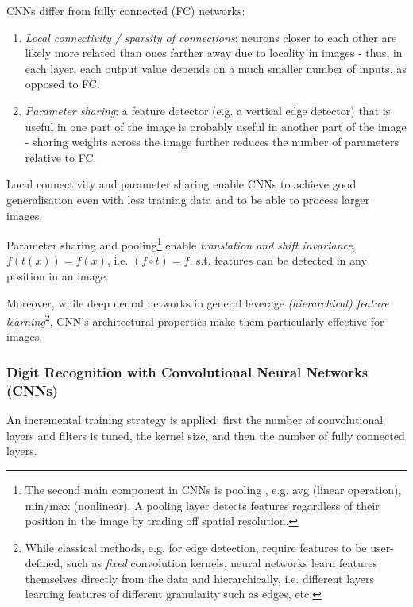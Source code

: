 CNNs differ from fully connected (FC) networks: \citep{Goodfellowetal2016}

\begin{enumerate}
\setlength{\itemsep}{0pt}
    \item \textit{Local connectivity / sparsity of connections}:
    neurons closer to each other are likely more related than ones farther away due to locality in images -
    thus, in each layer, each output value depends on a much smaller number of inputs, as opposed to FC.
    \item \textit{Parameter sharing}:
    a feature detector (e.g. a vertical edge detector)
    that is useful in one part of the image is probably useful in another part of the image \citep{ng2011mlcourse} -
    sharing weights across the image further reduces the number of parameters relative to FC.
\end{enumerate}

Local connectivity and parameter sharing enable CNNs to achieve
good generalisation even with less training data
and to be able to process larger images.

Parameter sharing and pooling\footnote{
    The second main component in CNNs is pooling \citep{dumoulin2018guideconvolutionarithmeticdeep},
    e.g. avg (linear operation), min/max (nonlinear).
    A pooling layer detects features regardless of their position in the image by trading off spatial resolution.
    } enable \textit{translation and shift invariance}, $f(t(x)) = f(x)$, i.e. $(f \circ t) = f$, s.t. features can be detected in any position in an image.

    Moreover, while deep neural networks in general leverage \textit{(hierarchical) feature learning}\footnote{
    While classical methods, e.g. for edge detection, require features to be user-defined, such as \textit{fixed} convolution kernels,
    neural networks learn features themselves directly from the data
    and hierarchically, i.e. different layers learning features of different granularity such as edges, etc.
}, CNN's architectural properties make them particularly effective for images.

\subsubsection{Digit Recognition with Convolutional Neural Networks (CNNs)}

An incremental training strategy \citep{tuningplaybookgithub} is applied:
first the number of convolutional layers and filters is tuned, the kernel size, and then the number of fully connected layers.

